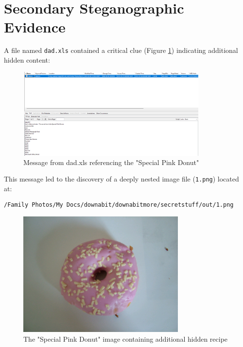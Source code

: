 \section{Secondary Steganographic Evidence}
A file named \texttt{dad.xls} contained a critical clue (Figure \ref{fig:dad_xls}) indicating additional hidden content:

\begin{figure}[htbp]
    \centering
    \includegraphics[width=0.85\textwidth]{images/Artifact and Evidence Recovery/dad_xls.png}
    \caption{Message from dad.xls referencing the "Special Pink Donut"}
    \label{fig:dad_xls}
\end{figure}

This message led to the discovery of a deeply nested image file (\texttt{1.png}) located at:
\begin{verbatim}
/Family Photos/My Docs/downabit/downabitmore/secretstuff/out/1.png
\end{verbatim}

\begin{figure}[htbp]
    \centering
    \includegraphics[width=0.75\textwidth]{images/Artifact and Evidence Recovery/SpecialPinkDonut_recipe.png}
    \caption{The "Special Pink Donut" image containing additional hidden recipe}
    \label{fig:pink_donut}
\end{figure}

